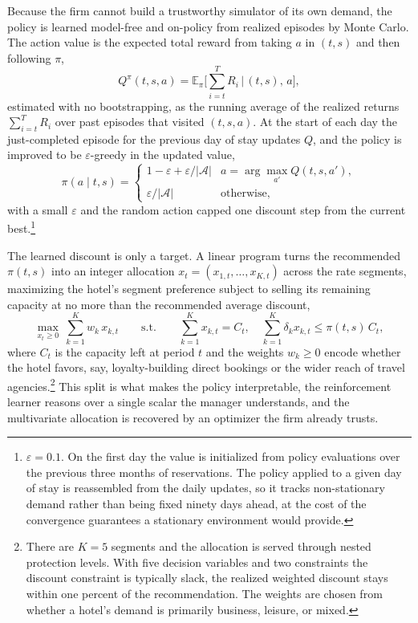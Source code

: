 Because the firm cannot build a trustworthy simulator of its own demand, the policy is learned model-free and on-policy from realized episodes by Monte Carlo. The action value is the expected total reward from taking $a$ in $(t,s)$ and then following $\pi$,
\begin{equation}
Q^\pi(t,s,a)=\mathbb{E}_\pi\Big[\textstyle\sum_{i=t}^{T} R_i \,\Big|\, (t,s),\,a\Big],
\end{equation}
estimated with no bootstrapping, as the running average of the realized returns $\sum_{i=t}^{T} R_i$ over past episodes that visited $(t,s,a)$. At the start of each day the just-completed episode for the previous day of stay updates $Q$, and the policy is improved to be $\varepsilon$-greedy in the updated value,
\begin{equation}
\pi(a\mid t,s)=
\begin{cases}
1-\varepsilon+\varepsilon/|\mathcal{A}| & a=\arg\max_{a'} Q(t,s,a'),\\[2pt]
\varepsilon/|\mathcal{A}| & \text{otherwise,}
\end{cases}
\end{equation}
with a small $\varepsilon$ and the random action capped one discount step from the current best.\footnote{$\varepsilon=0.1$. On the first day the value is initialized from policy evaluations over the previous three months of reservations. The policy applied to a given day of stay is reassembled from the daily updates, so it tracks non-stationary demand rather than being fixed ninety days ahead, at the cost of the convergence guarantees a stationary environment would provide.}

The learned discount is only a target. A linear program turns the recommended $\pi(t,s)$ into an integer allocation $x_t=(x_{1,t},\dots,x_{K,t})$ across the rate segments, maximizing the hotel's segment preference subject to selling its remaining capacity at no more than the recommended average discount,
\begin{equation}
\max_{x_t\ge 0}\ \sum_{k=1}^{K} w_k\,x_{k,t}
\qquad\text{s.t.}\qquad
\sum_{k=1}^{K} x_{k,t}=C_t,\quad
\sum_{k=1}^{K}\delta_k x_{k,t}\le \pi(t,s)\,C_t,
\end{equation}
where $C_t$ is the capacity left at period $t$ and the weights $w_k\ge 0$ encode whether the hotel favors, say, loyalty-building direct bookings or the wider reach of travel agencies.\footnote{There are $K=5$ segments and the allocation is served through nested protection levels. With five decision variables and two constraints the discount constraint is typically slack, the realized weighted discount stays within one percent of the recommendation. The weights are chosen from whether a hotel's demand is primarily business, leisure, or mixed.} This split is what makes the policy interpretable, the reinforcement learner reasons over a single scalar the manager understands, and the multivariate allocation is recovered by an optimizer the firm already trusts.


